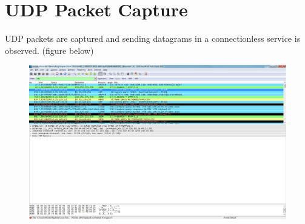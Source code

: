 \documentclass{article}
\begin{document}
\section{UDP Packet Capture}
UDP packets are captured and sending datagrams in a connectionless service is observed. (figure below)
\begin{figure}
\centering
\includegraphics[width=\textwidth,height=\textheight,keepaspectratio]{UDP.png}
\end{figure}
\end{document}
